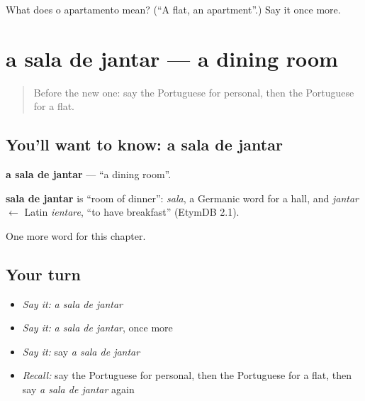 \begin{tcolorbox}[breakable,colback=teal!4,colframe=teal!35!black,title={Before you move on}]
What does o apartamento mean? (\textquotedblleft{}A flat, an apartment\textquotedblright{}.) Say it once more.
\end{tcolorbox}
\section[a sala de jantar]{a sala de jantar — a dining room}

\label{lesson:PT-C157-sala-de-jantar}



\begin{quote}
Before the new one: say the Portuguese for personal, then the Portuguese for a flat.
\end{quote}

\subsection*{You'll want to know: a sala de jantar}
\textbf{a sala de jantar} — \textquotedblleft{}a dining room\textquotedblright{}.

\begin{cousinweb}
\textbf{sala de jantar} is \textquotedblleft{}room of dinner\textquotedblright{}: \emph{sala}, a Germanic word for a hall, and \emph{jantar} $\leftarrow$ Latin \emph{ientare}, \textquotedblleft{}to have breakfast\textquotedblright{} (EtymDB 2.1).
\end{cousinweb}

\begin{grammarlens}[title={What you've built}]
One more word for this chapter.
\end{grammarlens}

\subsection*{Your turn}
\begin{itemize}
\raggedright
  \item \emph{Say it:} \emph{a sala de jantar}
  \item \emph{Say it:} \emph{a sala de jantar}, once more
  \item \emph{Say it:} say \emph{a sala de jantar}
  \item \emph{Recall:} say the Portuguese for personal, then the Portuguese for a flat, then say \emph{a sala de jantar} again
\end{itemize}

